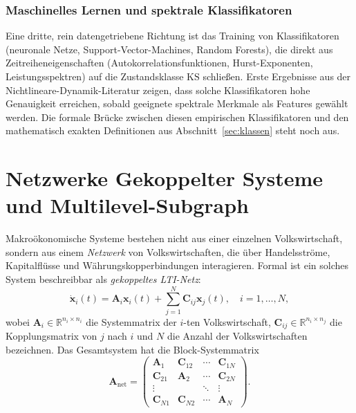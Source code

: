 ﻿\documentclass[12pt, a4paper, titlepage]{report}
\theoremstyle{definition}
\theoremstyle{remark}
\newcommand{\R}{\mathbb{R}}
\newcommand{\vx}{\bm{x}}
\newcommand{\vA}{\bm{A}}
\newcommand{\vC}{\bm{C}}
\newcommand{\KS}{\mathrm{KS}}
\begin{document}
\subsubsection*{Maschinelles Lernen und spektrale Klassifikatoren}

Eine dritte, rein datengetriebene Richtung ist das Training von Klassifikatoren
(neuronale Netze, Support-Vector-Machines, Random Forests), die direkt aus
Zeitreiheneigenschaften (Autokorrelationsfunktionen, Hurst-Exponenten,
Leistungsspektren) auf die Zustandsklasse $\KS$ schließen. Erste Ergebnisse aus
der Nichtlineare-Dynamik-Literatur zeigen, dass solche Klassifikatoren hohe
Genauigkeit erreichen, sobald geeignete spektrale Merkmale als Features gewählt werden.
Die formale Brücke zwischen diesen empirischen Klassifikatoren und den mathematisch
exakten Definitionen aus Abschnitt~\ref{sec:klassen} steht noch aus.

\section{Netzwerke Gekoppelter Systeme und Multilevel-Subgraph}
\label{subsec:netzwerke}

Makroökonomische Systeme bestehen nicht aus einer einzelnen Volkswirtschaft, sondern
	aus einem \emph{Netzwerk} von Volkswirtschaften, die über Handelsströme, Kapitalflüsse
und Währungskopper\-bindungen interagieren. Formal ist ein solches System beschreibbar
als \emph{gekoppeltes LTI-Netz}:
\begin{equation}
  \dot{\vx}_i(t) = \vA_i\vx_i(t) + \sum_{j=1}^{N} \vC_{ij}\vx_j(t), \quad i = 1, \ldots, N,
  \label{eq:netz}
\end{equation}
wobei $\vA_i \in \R^{n_i \times n_i}$ die Systemmatrix der $i$-ten Volkswirtschaft,
$\vC_{ij} \in \R^{n_i \times n_j}$ die Kopplungsmatrix von $j$ nach $i$
und $N$ die Anzahl der Volkswirtschaften bezeichnen. Das Gesamtsystem hat die
Block-Systemmatrix
\begin{equation}
  \vA_{\mathrm{net}} = \begin{pmatrix}
    \vA_1 & \vC_{12} & \cdots & \vC_{1N} \\
    \vC_{21} & \vA_2 & \cdots & \vC_{2N} \\
    \vdots & & \ddots & \vdots \\
    \vC_{N1} & \vC_{N2} & \cdots & \vA_N
  \end{pmatrix}.
  \label{eq:blockmat}
\end{equation}
\end{document}

